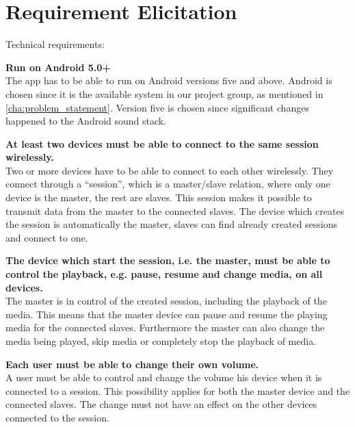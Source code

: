 \section{Requirement Elicitation}

Technical requirements:

\begin{eletterate}
    \item \textbf{Run on Android 5.0+} \hfill\\
        The app has to be able to run on Android versions five and above.
        Android is chosen since it is the available system in our project group, as mentioned in \cref{cha:problem_statement}.
        Version five is chosen since significant changes happened to the Android sound stack\cite{android_5_sound_stack}.

    \item \textbf{At least two devices must be able to connect to the same session wirelessly.} \hfill\\
        Two or more devices have to be able to connect to each other wirelessly.
        They connect through a ``session'', which is a master/slave relation, where only one device is the master, the rest are slaves.
        This session makes it possible to transmit data from the master to the connected slaves.
        The device which creates the session is automatically the master, slaves can find already created sessions and connect to one.

    \item \textbf{The device which start the session, i.e. the master, must be able to control the playback, e.g. pause, resume and change media, on all devices.} \hfill\\
        The master is in control of the created session, including the playback of the media.
        This means that the master device can pause and resume the playing media for the connected slaves.
        Furthermore the master can also change the media being played, skip media or completely stop the playback of media.

    \item \textbf{Each user must be able to change their own volume.} \hfill\\
        A user must be able to control and change the volume his device when it is connected to a session.
        This possibility applies for both the master device and the connected slaves.
        The change must not have an effect on the other devices connected to the session.


\end{eletterate}

